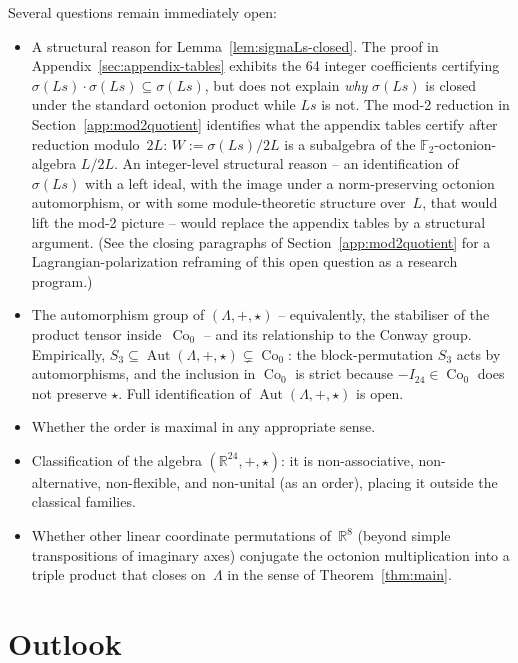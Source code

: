 \documentclass[twoside,english]{paper}
\numberwithin{equation}{section}
\numberwithin{figure}{section}
\theoremstyle{definition}
\theoremstyle{remark}
\newcommand{\RR}{\mathbb{R}}
\newcommand{\FF}{\mathbb{F}}
\newcommand{\LL}{\Lambda}             %
\DeclareMathOperator{\Co}{Co}
\DeclareMathOperator{\Aut}{Aut}
\begin{document}
Several questions remain immediately open:
\begin{itemize}
\item A structural reason for Lemma~\ref{lem:sigmaLs-closed}.  The
  proof in Appendix~\ref{sec:appendix-tables} exhibits the 64
  integer coefficients certifying $\sigma(Ls)\cdot\sigma(Ls) \subseteq
  \sigma(Ls)$, but does not explain \emph{why} $\sigma(Ls)$ is closed
  under the standard octonion product while $Ls$ is not.  The mod-2
  reduction in Section~\ref{app:mod2quotient} identifies what the
  appendix tables certify after reduction modulo~$2L$: $W :=
  \sigma(Ls)/2L$ is a subalgebra of the $\FF_2$-octonion-algebra
  $L/2L$.  An integer-level structural reason -- an identification of
  $\sigma(Ls)$ with a left ideal, with the image under a
  norm-preserving octonion automorphism, or with some module-theoretic
  structure over~$L$, that would lift the mod-2 picture -- would
  replace the appendix tables by a structural argument.  (See the
  closing paragraphs of Section~\ref{app:mod2quotient} for a
  Lagrangian-polarization reframing of this open question as a
  research program.)
\item The automorphism group of $(\LL, +, \star)$ -- equivalently,
  the stabiliser of the product tensor inside~$\Co_0$ -- and its
  relationship to the Conway group.  Empirically,
  $S_3 \subseteq \Aut(\LL, +, \star) \subsetneq \Co_0$: the
  block-permutation $S_3$ acts by automorphisms, and the inclusion
  in $\Co_0$ is strict because $-I_{24} \in \Co_0$ does not preserve
  $\star$.  Full identification of $\Aut(\LL, +, \star)$ is open.
\item Whether the order is maximal in any appropriate sense.
\item Classification of the algebra $(\RR^{24}, +, \star)$: it is
  non-associative, non-alternative, non-flexible, and non-unital
  (as an order), placing it outside the classical families.
\item Whether other linear coordinate permutations of~$\RR^8$
  (beyond simple transpositions of imaginary axes) conjugate the
  octonion multiplication into a triple product that closes
  on~$\LL$ in the sense of Theorem~\ref{thm:main}.
\end{itemize}

\section{Outlook}\label{sec:outlook}
\end{document}
